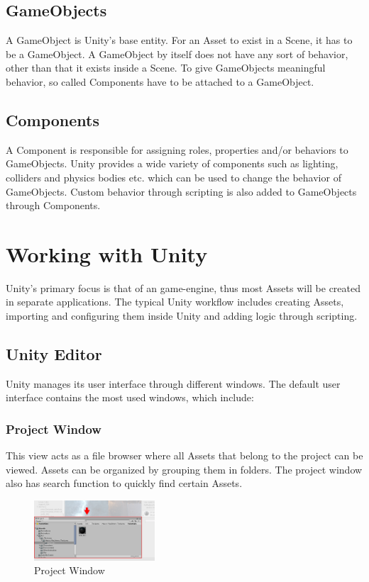 \subsection{GameObjects}
A GameObject is Unity's base entity. For an Asset to exist in a Scene, it has to be a GameObject. A GameObject by itself does not have any sort of behavior, other than that it exists inside a Scene. To give GameObjects meaningful behavior, so called Components have to be attached to a GameObject.

\subsection{Components}
A Component is responsible for assigning roles, properties and/or behaviors to GameObjects. Unity provides a wide variety of components such as lighting, colliders and physics bodies etc. which can be used to change the behavior of GameObjects. Custom behavior through scripting is also added to GameObjects through Components.



\section{Working with Unity}
Unity's primary focus is that of an game-engine, thus most Assets will be created in separate applications. The typical Unity workflow includes creating Assets, importing and configuring them inside Unity and adding logic through scripting.

\subsection{Unity Editor}
Unity manages its user interface through different windows. The default user interface contains the most used windows, which include:

\subsubsection{Project Window}
This view acts as a file browser where all Assets that belong to the project can be viewed. Assets can be organized by grouping them in folders. The project window also has search function to quickly find certain Assets.
\begin{figure}[H]
  \centering
  \includegraphics[width=0.4\textwidth]{images/ProjectWindow.png}
  \caption{Project Window}
\end{figure}

